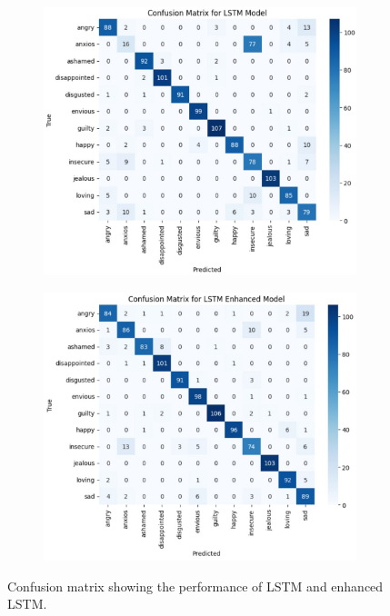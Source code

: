 \documentclass[conference]{IEEEtran}
\begin{document}
\begin{figure}[!htbp]
\centering
\captionsetup[subfigure]{justification=centering}
\captionsetup{justification=centering}

  \begin{subfigure}{0.48\linewidth}
  \centering
    \includegraphics[width=\linewidth]{mat_lstm.jpg}
    \caption{}
    \label{plots:3-a}
  \end{subfigure}
  \hfill
  \begin{subfigure}{0.48\linewidth}
  \centering
    \includegraphics[width=\linewidth]{mat_lstm_enhanced.jpg}
    \caption{}
    \label{plots:3-b}
  \end{subfigure}

  \caption{Confusion matrix showing the performance of LSTM and enhanced LSTM.}
  \label{fig:baseline3}
\end{figure}
\end{document}
